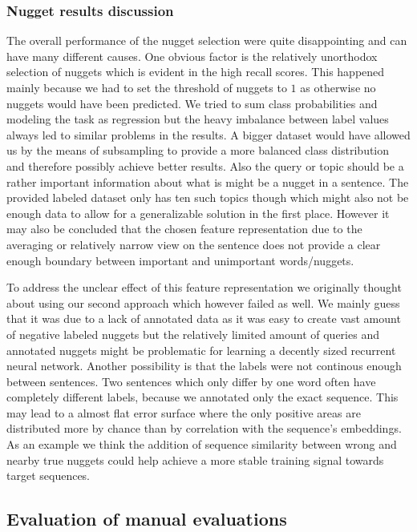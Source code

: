 \documentclass{article}
\begin{document}
\subsubsection{Nugget results discussion}
The overall performance of the nugget selection were quite disappointing and can have many different causes. One obvious factor is the relatively unorthodox selection of nuggets which is evident in the high recall scores. This happened mainly because we had to set the threshold of nuggets to $1$ as otherwise no nuggets would have been predicted. We tried to sum class probabilities and modeling the task as regression but the heavy imbalance between label values always led to similar problems in the results. A bigger dataset would have allowed us by the means of subsampling to provide a more balanced class distribution and therefore possibly achieve better results. Also the query or topic should be a rather important information about what is might be a nugget in a sentence. The provided labeled dataset only has ten such topics though which might also not be enough data to allow for a generalizable solution in the first place.  However it may also be concluded that the chosen feature representation due to the averaging or relatively narrow view on the sentence does not provide a clear enough boundary between important and unimportant words/nuggets.

To address the unclear effect of this feature representation we originally thought about using our second approach which however failed as well. We mainly guess that it was due to a lack of annotated data as it was easy to create vast amount of negative labeled nuggets but the relatively limited amount of queries and annotated nuggets might be problematic for learning a decently sized recurrent neural network. Another possibility is that the labels were not continous enough between sentences. Two sentences which only differ by one word often have completely different labels, because we annotated only the exact sequence. This may lead to a almost flat error surface where the only positive areas are distributed more by chance than by correlation with the sequence's embeddings. As an example we think the addition of sequence similarity between wrong and nearby true nuggets could help achieve a more stable training signal towards target sequences.
\subsection{Evaluation of manual evaluations}
\label{subsec:maneval}










\end{document}
